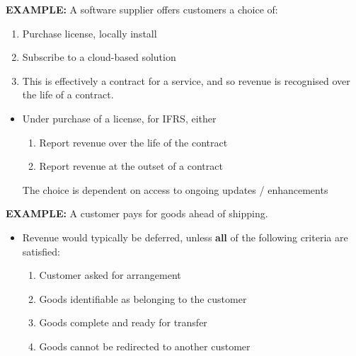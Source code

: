 \documentclass[../notes_compiled.tex]{subfiles}
\begin{document}
\begin{itemize}
{}
{\color{RedViolet}
\item[] \textbf{EXAMPLE:} A software supplier offers customers a choice of:
\begin{enumerate}
\item Purchase license, locally install
\item Subscribe to a cloud-based solution
\item This is effectively a contract for a service, and so revenue is recognised over the life of a contract.
\end{enumerate}
}
{\color{RoyalBlue}
\begin{itemize}
\item Under purchase of a license, for IFRS, either
\begin{enumerate}
\item Report revenue over the life of the contract
\item Report revenue at the outset of a contract
\end{enumerate}
The choice is dependent on access to ongoing updates / enhancements
\end{itemize}
}
{\color{RedViolet}
\item[] \textbf{EXAMPLE:} A customer pays for goods ahead of shipping.
}
{\color{RoyalBlue}
\begin{itemize}
\item Revenue would typically be deferred, unless \textbf{all} of the following criteria are satisfied:
\begin{enumerate}
\item Customer asked for arrangement
\item Goods identifiable as belonging to the customer
\item Goods complete and ready for transfer
\item Goods cannot be redirected to another customer
\end{enumerate}
\end{itemize}
}
\end{itemize}
\end{document}
